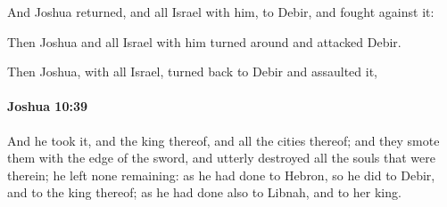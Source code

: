 			\begin{versebox}
					\item[BHS] 
					\item[ASV] And Joshua returned, and all Israel with him, to Debir, and fought against it:
					\item[NIV] Then Joshua and all Israel with him turned around and attacked Debir.
					\item[NRSV] Then Joshua, with all Israel, turned back to Debir and assaulted it,
			\end{versebox}

		\paragraph{Joshua 10:39} %
			\label{JOSHUA-10-39}

			And he took it, and the king thereof, and all the cities thereof; and they smote them with the edge of the sword, and utterly destroyed all the souls that were therein; he left none remaining: as he had done to Hebron, so he did to Debir, and to the king thereof; as he had done also to Libnah, and to her king.

